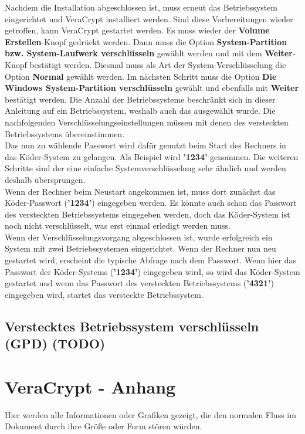 \documentclass[12pt,a4paper]{scrreprt}
\begin{document}
\noindent Nachdem die Installation abgeschlossen ist, muss erneut das Betriebssystem eingerichtet und VeraCrypt installiert werden. Sind diese Vorbereitungen wieder getroffen, kann VeraCrypt gestartet werden. Es muss wieder der \textbf{Volume Erstellen}-Knopf gedrückt werden. Dann muss die Option \textbf{System-Partition bzw. System-Laufwerk verschlüsseln} gewählt werden und mit dem \textbf{Weiter}-Knopf bestätigt werden. Diesmal muss als Art der System-Verschlüsselung die Option \textbf{Normal} gewählt werden. Im nächsten Schritt muss die Option \textbf{Die Windows System-Partition verschlüsseln} gewählt und ebenfalls mit \textbf{Weiter} bestätigt werden. Die Anzahl der Betriebssysteme beschränkt sich in dieser Anleitung auf ein Betriebssystem, weshalb auch das ausgewählt wurde. Die nachfolgenden Verschlüsselungseinstellungen müssen mit denen des versteckten Betriebssystems übereinstimmen. \\

\noindent Das nun zu wählende Passwort wird dafür genutzt beim Start des Rechners in das Köder-System zu gelangen. Als Beispiel wird \textbf{'1234'} genommen. Die weiteren Schritte sind der eine einfache Systemverschlüsselung sehr ähnlich und werden deshalb übersprungen. \\

\noindent Wenn der Rechner beim Neustart angekommen ist, muss dort zunächst das Köder-Passwort (\textbf{'1234'}) eingegeben werden. Es könnte auch schon das Passwort des versteckten Betriebssystems eingegeben werden, doch das Köder-System ist noch nicht verschlüsselt, was erst einmal erledigt werden muss. \\

\noindent Wenn der Verschlüsselungsvorgang abgeschlossen ist, wurde erfolgreich ein System mit zwei Betriebssystemen eingerichtet. Wenn der Rechner nun neu gestartet wird, erscheint die typische Abfrage nach dem Passwort. Wenn hier das Passwort der Köder-Systems (\textbf{'1234'}) eingegeben wird, so wird das Köder-System gestartet und wenn das Passwort des versteckten Betriebssystems (\textbf{'4321'}) eingegeben wird, startet das versteckte Betriebssystem.

\section{Verstecktes Betriebssystem verschlüsseln (GPD) (TODO)}

\chapter{VeraCrypt - Anhang}
Hier werden alle Informationen oder Grafiken gezeigt, die den normalen Fluss im Dokument durch ihre Größe oder Form stören würden.
\end{document}
